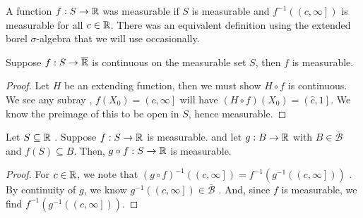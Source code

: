 \begin{recall}
	A function \(f: S \to \mathbb{R}\) was measurable if \(S\) is measurable and \(f^{-1}\left( \left( c, \infty \right]  \right) \) is measurable for all \(c \in \mathbb{R}\). There was an equivalent definition using the extended borel \(\sigma\)-algebra that we will use occasionally.
\end{recall}
\begin{proposition}
	Suppose \(f: S \to \overline{\mathbb{R}}\) is continuous on the measurable set \(S\), then \(f\) is measurable.
\end{proposition}
\begin{proof}
	Let \(H\) be an extending function, then we must show \(H \circ f\) is continuous. We see any subray , \(f\left( X_0 \right) = \left( c , \infty \right] \) will have \((H \circ f)\left( X_0 \right) = \left( \hat{c}, 1 \right] \). We know the preimage of this to be open in \(S\), hence measurable.
\end{proof}
\begin{proposition}
	Let \(S \subseteq \mathbb{R}\)	. Suppose \(f: S \to \mathbb{R}\) is measurable. and let \(g: B \to \mathbb{R}\) with \(B \in \overline{\mathscr{B}}\)  and \(f\left( S \right) \subseteq B\). Then, \(g \circ f: S \to \mathbb{R}\) is measurable.
\end{proposition}
\begin{proof}
	For \(c \in \mathbb{R}\), we note that \(\left( g \circ f \right) ^{-1} \left( \left( c, \infty \right]  \right)  = f^{-1}\left( g^{-1}\left( \left( c, \infty \right]  \right)  \right) \) . By continuity of \(g\), we know \(g^{-1}\left( \left( c, \infty \right]  \right) \in \overline{\mathscr{B}}\) . And, since \(f\) is measurable, we find \(f^{-1}\left( g^{-1}\left( \left( c, \infty \right]  \right)  \right) \).
\end{proof}
\begin{corollary}[]

\end{corollary}
